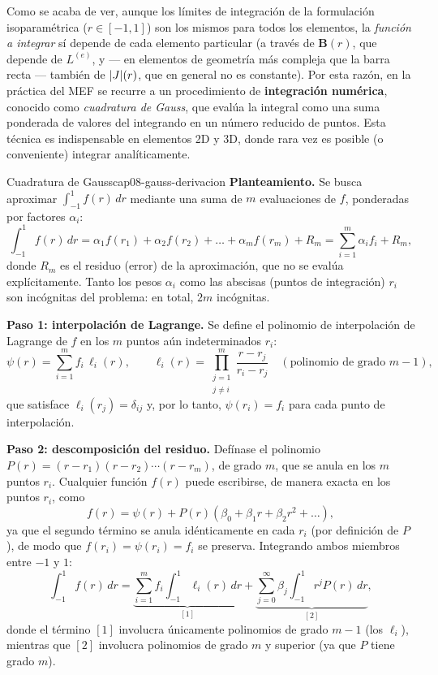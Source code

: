 Como se acaba de ver, aunque los límites de integración de la formulación isoparamétrica ($r\in[-1,1]$) son los mismos para todos los elementos, la \emph{función a integrar} sí depende de cada elemento particular (a través de $\bm B(r)$, que depende de $L^{(e)}$, y --- en elementos de geometría más compleja que la barra recta --- también de $\abs{J}(r)$, que en general no es constante). Por esta razón, en la práctica del MEF se recurre a un procedimiento de \textbf{integración numérica}, conocido como \emph{cuadratura de Gauss}, que evalúa la integral como una suma ponderada de valores del integrando en un número reducido de puntos. Esta técnica es indispensable en elementos 2D y 3D, donde rara vez es posible (o conveniente) integrar analíticamente.

\begin{teorema}{Cuadratura de Gauss}{cap08-gauss-derivacion}
\textbf{Planteamiento.} Se busca aproximar $\int_{-1}^{1} f(r)\,dr$ mediante una suma de $m$ evaluaciones de $f$, ponderadas por factores $\alpha_i$:
\[
\int_{-1}^{1} f(r)\,dr = \alpha_1 f(r_1) + \alpha_2 f(r_2) + \dots + \alpha_m f(r_m) + R_m = \sum_{i=1}^m \alpha_i f_i + R_m ,
\]
donde $R_m$ es el residuo (error) de la aproximación, que no se evalúa explícitamente. Tanto los pesos $\alpha_i$ como las abscisas (puntos de integración) $r_i$ son incógnitas del problema: en total, $2m$ incógnitas.

\textbf{Paso 1: interpolación de Lagrange.} Se define el polinomio de interpolación de Lagrange de $f$ en los $m$ puntos aún indeterminados $r_i$:
\[
\psi(r) = \sum_{i=1}^m f_i \, \ell_i(r), \qquad \ell_i(r) = \prod_{\substack{j=1\\j\neq i}}^m \frac{r-r_j}{r_i-r_j} \quad (\text{polinomio de grado } m-1),
\]
que satisface $\ell_i(r_j)=\delta_{ij}$ y, por lo tanto, $\psi(r_i)=f_i$ para cada punto de interpolación.

\textbf{Paso 2: descomposición del residuo.} Defínase el polinomio $P(r)=(r-r_1)(r-r_2)\cdots(r-r_m)$, de grado $m$, que se anula en los $m$ puntos $r_i$. Cualquier función $f(r)$ puede escribirse, de manera exacta en los puntos $r_i$, como
\[
f(r) = \psi(r) + P(r)\left(\beta_0+\beta_1 r+\beta_2 r^2+\dots\right) ,
\]
ya que el segundo término se anula idénticamente en cada $r_i$ (por definición de $P$), de modo que $f(r_i)=\psi(r_i)=f_i$ se preserva. Integrando ambos miembros entre $-1$ y $1$:
\[
\int_{-1}^{1} f(r)\,dr = \underbrace{\sum_{i=1}^m f_i \int_{-1}^1 \ell_i(r)\,dr}_{[1]} + \underbrace{\sum_{j=0}^{\infty}\beta_j\int_{-1}^1 r^j P(r)\,dr}_{[2]} ,
\]
donde el término $[1]$ involucra únicamente polinomios de grado $m-1$ (los $\ell_i$), mientras que $[2]$ involucra polinomios de grado $m$ y superior (ya que $P$ tiene grado $m$).


\end{teorema}
